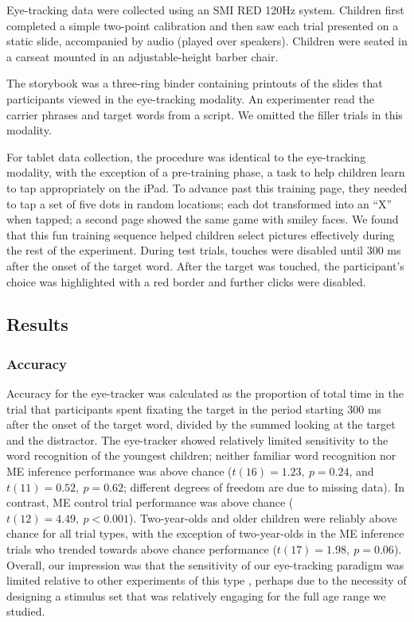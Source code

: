 \documentclass[man,noapacite]{apa2}
\begin{document}
Eye-tracking data were collected using an SMI RED 120Hz system. Children first completed a simple two-point calibration and then saw each trial presented on a static slide, accompanied by audio (played over speakers). Children were seated in a carseat mounted in an adjustable-height barber chair. 

The storybook was a three-ring binder containing printouts of the slides that participants viewed in the eye-tracking modality. An experimenter read the carrier phrases and target words from a script. We omitted the filler trials in this modality.

For tablet data collection, the procedure was identical to the eye-tracking modality, with the exception of a pre-training phase, a task to help children learn to tap appropriately on the iPad. To advance past this training page, they needed to tap a set of five dots in random locations; each dot transformed into an ``X'' when tapped; a second page showed the same game with smiley faces. We found that this fun training sequence helped children select pictures effectively during the rest of the experiment. During test trials, touches were disabled until 300 ms after the onset of the target word. After the target was touched, the participant's choice was highlighted with a red border and further clicks were disabled.  

\subsection{Results}

\subsubsection{Accuracy}

Accuracy for the eye-tracker was calculated as the proportion of total time in the trial that participants spent fixating the target in the period starting 300 ms after the onset of the target word, divided by the summed looking at the target and the distractor. The eye-tracker showed relatively limited sensitivity to the word recognition of the youngest children; neither familiar word recognition nor ME inference performance was above chance ($t(16) = 1.23,~p = 0.24$, and $t(11) = 0.52,~p = 0.62$; different degrees of freedom are due to missing data). In contrast, ME control trial performance was above chance ($t(12) = 4.49,~p < 0.001$). Two-year-olds and older children were reliably above chance for all trial types, with the exception of two-year-olds in the ME inference trials who trended towards above chance performance ($t(17) = 1.98,~p = 0.06$). Overall, our impression was that the sensitivity of our eye-tracking paradigm was limited relative to other experiments of this type \cite{fernald2006}, perhaps due to the necessity of designing a stimulus set that was relatively engaging for the full age range we studied. 
\end{document}
